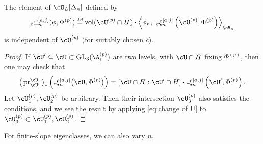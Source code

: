 \documentclass[10pt,reqno,a4paper]{amsart}
\newcommand{\subf}{_{\mathrm{f}}}
\newcommand{\GL}{\mathrm{GL}}
\begin{document}
\begin{proposition}\label{cor:ind of U}
The element of $\cO_L[\Delta_n]$ defined by
\begin{equation}\label{eq:measure finite level}
	{}_c\Xi_n^{[a,j]}(\phi, \Phi^{(p)}) \defeq \operatorname{vol}(\cU^{(p)} \cap H) \cdot \left\langle \phi_n,\  {}_c \xi_{n}^{[a,j]}\left( \cU^{(p)}, \Phi^{(p)}\right) \right\rangle_{\cV_n}
\end{equation}
is independent of $\cU^{(p)}$ (for suitably chosen $c$).
\end{proposition}
\begin{proof}
If $\cU' \subseteq \cU \subset \GL_3(\A\subf^{(p)})$ are two levels, with $\cU \cap H$ fixing $\Phi^{(p)}$, then one may check that
\begin{equation}\label{eq:change of U}
	\big(\operatorname{pr}^{\cU}_{\cU'}\big)_\ast\left({}_c\xi_{n}^{[a,j]}\big(\cU, \Phi^{(p)}\big)\right) = [\cU \cap H : \cU' \cap H] \cdot  {}_c\xi_{n}^{[a,j]}\left(\cU', \Phi^{(p)}\right).
\end{equation}
Let $\cU_1^{(p)}, \cU^{(p)}_2$ be arbitrary. Then their intersection $\cU_3^{(p)}$ also satisfies the conditions, and we see the result by applying \eqref{eq:change of U} to $\cU_3^{(p)} \subset \cU_1^{(p)}, \cU_2^{(p)}$.
\end{proof}


For finite-slope eigenclasses, we can also vary $n$.
\end{document}
